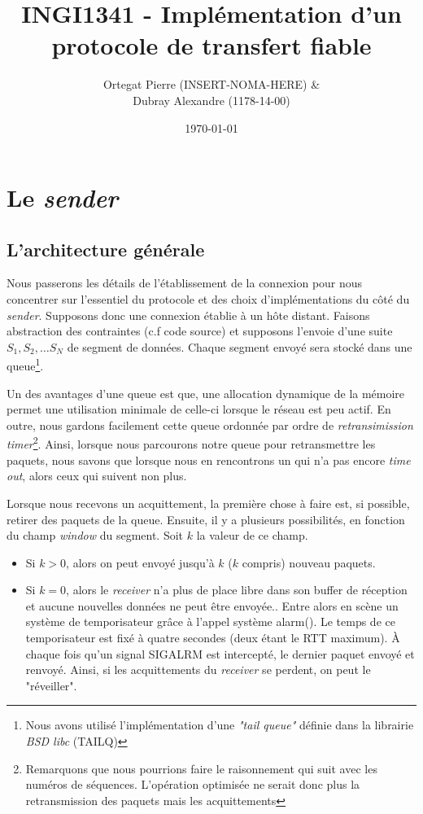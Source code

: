 \documentclass[12pt,notitlepage]{report}
\title{INGI1341 - Implémentation d'un protocole de transfert fiable}
\author{Ortegat Pierre (INSERT-NOMA-HERE) \& \\ Dubray Alexandre (1178-14-00)}
\date{\today}
\begin{document}
\maketitle

\section{Le \textit{sender}}
	\subsection{L'architecture générale}
	Nous passerons les détails de l'établissement de la connexion pour nous concentrer sur l'essentiel du protocole et des choix d'implémentations du côté du \textit{sender}. Supposons donc une connexion établie à un hôte distant. Faisons abstraction des contraintes (c.f code source) et supposons l'envoie d'une suite $S_1 , S_2, \ldots S_N$ de segment de données. Chaque segment envoyé sera stocké dans une queue\footnote{Nous avons utilisé l'implémentation d'une \textit{"tail queue"} définie dans la librairie \textit{BSD libc} (TAILQ)}. 
	
	Un des avantages d'une queue est que, une allocation dynamique de la mémoire permet une utilisation minimale de celle-ci lorsque le réseau est peu actif.	En outre, nous gardons facilement cette queue ordonnée par ordre de \textit{retransimission timer}\footnote{Remarquons que nous pourrions faire le raisonnement qui suit avec les numéros de séquences. L'opération optimisée ne serait donc plus la retransmission des paquets mais les acquittements}. Ainsi, lorsque nous parcourons notre queue pour retransmettre les paquets, nous savons que lorsque nous en rencontrons un qui n'a pas encore \textit{time out}, alors ceux qui suivent non plus.
	
	Lorsque nous recevons un acquittement, la première chose à faire est, si possible, retirer des paquets de la queue. Ensuite, il y a plusieurs possibilités, en fonction du champ \textit{window} du segment. Soit $k$ la valeur de ce champ.
	\begin{itemize}
		\item Si $k > 0$, alors on peut envoyé jusqu'à $k$ ($k$ compris) nouveau paquets.
		\item Si $k = 0$, alors le \textit{receiver} n'a plus de place libre dans son buffer de réception et aucune nouvelles données ne peut être envoyée.. Entre alors en scène un système de temporisateur grâce à l'appel système alarm(). Le temps de ce temporisateur est fixé à quatre secondes (deux étant le RTT maximum). À chaque fois qu'un signal SIGALRM est intercepté, le dernier paquet envoyé et renvoyé. Ainsi, si les acquittements du \textit{receiver} se perdent, on peut le "réveiller".
	\end{itemize}
\end{document}
